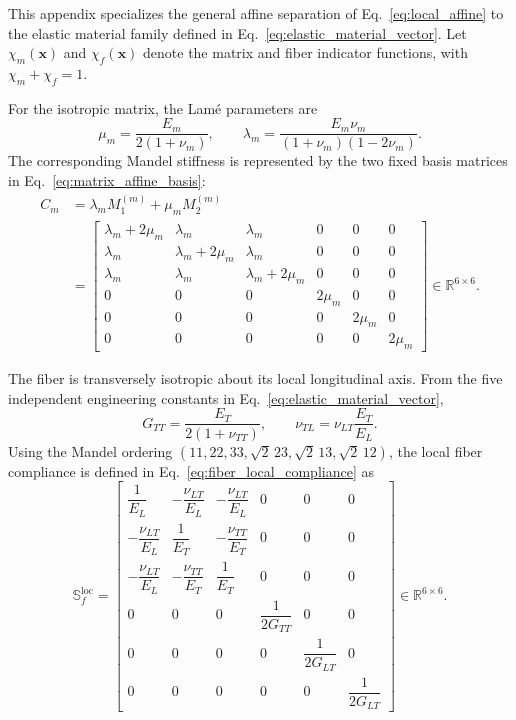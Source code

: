 \documentclass[pdflatex,sn-basic,Numbered]{sn-jnl}
\newcommand{\R}{\mathbb{R}}
\begin{document}
This appendix specializes the general affine separation of
Eq.~\eqref{eq:local_affine} to the elastic material family defined in
Eq.~\eqref{eq:elastic_material_vector}. Let
\(\chi_m(\boldsymbol x)\) and \(\chi_f(\boldsymbol x)\) denote the matrix and
fiber indicator functions, with \(\chi_m+\chi_f=1\).

For the isotropic matrix, the Lam\'e parameters are
\[
\mu_m
=
\frac{E_m}{2(1+\nu_m)},
\qquad
\lambda_m
=
\frac{E_m\nu_m}{(1+\nu_m)(1-2\nu_m)}.
\]
The corresponding Mandel stiffness is represented by the two fixed basis
matrices in Eq.~\eqref{eq:matrix_affine_basis}:
\begin{equation}
\label{eq:matrix_affine_basis}
\begin{aligned}
C_m
&=
\lambda_m M^{(m)}_1
+
\mu_m M^{(m)}_2\\
&=
\begin{bmatrix}
\lambda_m+2\mu_m & \lambda_m & \lambda_m & 0 & 0 & 0\\
\lambda_m & \lambda_m+2\mu_m & \lambda_m & 0 & 0 & 0\\
\lambda_m & \lambda_m & \lambda_m+2\mu_m & 0 & 0 & 0\\
0&0&0&2\mu_m&0&0\\
0&0&0&0&2\mu_m&0\\
0&0&0&0&0&2\mu_m
\end{bmatrix}
\in\R^{6\times6}.
\end{aligned}
\end{equation}

The fiber is transversely isotropic about its local longitudinal axis. From
the five independent engineering constants in
Eq.~\eqref{eq:elastic_material_vector},
\[
G_{TT}
=
\frac{E_T}{2(1+\nu_{TT})},
\qquad
\nu_{TL}
=
\nu_{LT}\frac{E_T}{E_L}.
\]
Using the Mandel ordering
\((11,22,33,\sqrt{2}\,23,\sqrt{2}\,13,\sqrt{2}\,12)\), the local fiber
compliance is defined in Eq.~\eqref{eq:fiber_local_compliance} as
\begin{equation}
\label{eq:fiber_local_compliance}
\mathbb S_f^{\mathrm{loc}}
=
\begin{bmatrix}
\dfrac{1}{E_L} & -\dfrac{\nu_{LT}}{E_L} & -\dfrac{\nu_{LT}}{E_L} & 0&0&0
\\[2mm]
-\dfrac{\nu_{LT}}{E_L} & \dfrac{1}{E_T} & -\dfrac{\nu_{TT}}{E_T} & 0&0&0
\\[2mm]
-\dfrac{\nu_{LT}}{E_L} & -\dfrac{\nu_{TT}}{E_T} & \dfrac{1}{E_T} & 0&0&0
\\[2mm]
0&0&0&\dfrac{1}{2G_{TT}}&0&0
\\[2mm]
0&0&0&0&\dfrac{1}{2G_{LT}}&0
\\[2mm]
0&0&0&0&0&\dfrac{1}{2G_{LT}}
\end{bmatrix}
\in\R^{6\times6}.
\end{equation}
\end{document}
